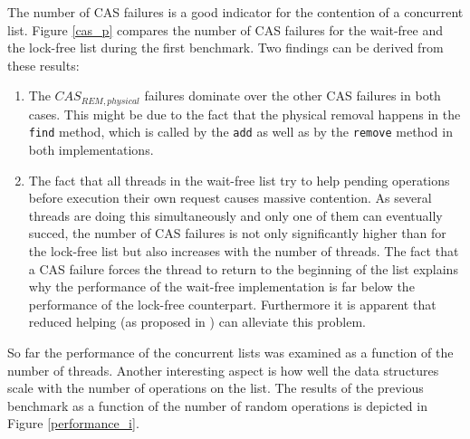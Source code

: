 \documentclass[a4paper, 12pt]{article}
\begin{document}
The number of CAS failures is a good indicator for the contention of a concurrent list. Figure \ref{cas_p} compares the number of CAS failures for the wait-free and the lock-free list during the first benchmark. Two findings can be derived from these results:
\begin{enumerate}
\item{The $CAS_{REM, physical}$ failures dominate over the other CAS failures in both cases. This might be due to the fact that the physical removal happens in the \verb|find| method, which is called by the \verb|add| as well as by the \verb|remove| method in both implementations.}
\item{The fact that all threads in the wait-free list try to help pending operations before execution their own request causes massive contention. As several threads are doing this simultaneously and only one of them can eventually succed, the number of CAS failures is not only significantly higher than for the lock-free list but also increases with the number of threads. The fact that a CAS failure forces the thread to return to the beginning of the list explains why the performance of the wait-free implementation is far below the performance of the lock-free counterpart. Furthermore it is apparent that reduced helping (as proposed in \cite{timnat12}) can alleviate this problem.}
\end{enumerate}

So far the performance of the concurrent lists was examined as a function of the number of threads. Another interesting aspect is how well the data structures scale with the number of operations on the list. The results of the previous benchmark as a function of the number of random operations is depicted in Figure \ref{performance_i}.
\end{document}
